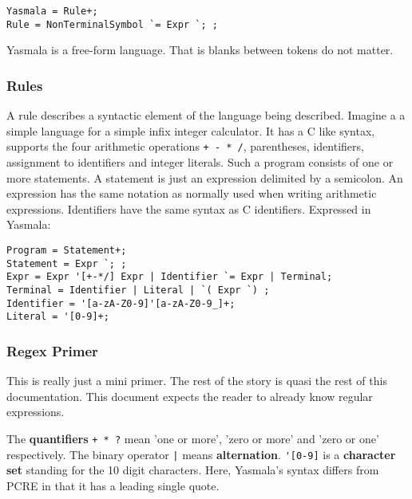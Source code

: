 \documentclass[a4paper]{report}
\begin{document}
\begin{verbatim}
Yasmala = Rule+;
Rule = NonTerminalSymbol `= Expr `; ;
\end{verbatim}

Yasmala is a free-form language. That is blanks between tokens do not matter.

\subsubsection{Rules}
A rule describes a syntactic element of the language being described. Imagine a a
simple language for a simple infix integer calculator. It has a C like syntax,
supports the four arithmetic operations \verb|+ - * /|, parentheses,
identifiers, assignment to identifiers and integer literals. Such a program
consists of one or more statements. A statement is just an expression delimited
by a semicolon. An expression has the same notation as normally used when writing
arithmetic expressions. Identifiers have the same syntax as C identifiers.
Expressed in Yasmala:

\begin{verbatim}
Program = Statement+;
Statement = Expr `; ;
Expr = Expr '[+-*/] Expr | Identifier `= Expr | Terminal;
Terminal = Identifier | Literal | `( Expr `) ;
Identifier = '[a-zA-Z0-9]'[a-zA-Z0-9_]+;
Literal = '[0-9]+;
\end{verbatim}

\subsubsection{Regex Primer}
This is really just a mini primer. The rest of the story is quasi the rest of
this documentation. This document expects the reader to already know regular
expressions.

The \textbf{quantifiers} \verb|+ * ?| mean 'one or more', 'zero or more' and
'zero or one' respectively. The binary operator \verb+|+ means
\textbf{alternation}. \verb|'[0-9]| is a \textbf{character set} standing for the
10 digit characters. Here, Yasmala's syntax differs from PCRE in that it has a
leading single quote.
\end{document}
